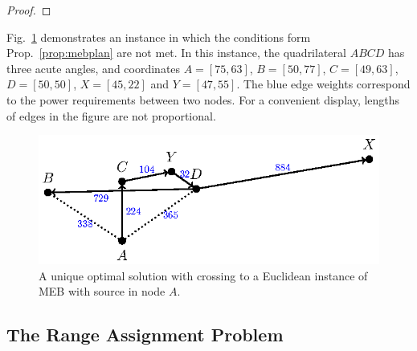 \begin{proof}
%
\end{proof}
Fig.~\ref{fig:mebnonplan} demonstrates an instance in which the conditions form Prop.~\ref{prop:mebplan} are not met. 
In this instance, the quadrilateral $ABCD$ has three acute angles, and coordinates $A=[75,63]$, $B=[50,77]$, $C=[49,63]$, $D=[50,50]$, $X=[45,22]$ and $Y=[47,55]$.
The blue edge weights correspond to the power requirements between two nodes. 
For a convenient display, lengths of edges in the figure are not proportional.
\begin{figure}[htb!]
  \centering
  \includegraphics[scale=1.4]{figurer/mebnonplanar.eps}
	\caption{A unique optimal solution with crossing to a Euclidean instance of  MEB with source in node $A$.}
  \label{fig:mebnonplan}
\end{figure}

\subsection{The Range Assignment Problem}

